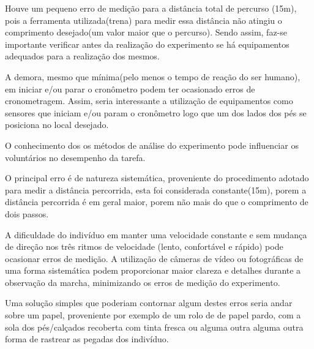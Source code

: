 \documentclass[a4paper,10pt]{article}
\begin{document}
Houve um pequeno erro de medição para a distância total de percurso (15m), pois a ferramenta utilizada(trena) para medir essa distância não atingiu o comprimento desejado(um valor maior que o percurso). Sendo assim, faz-se importante verificar antes da realização do experimento se há equipamentos adequados para a realização dos mesmos.

A demora, mesmo que mínima(pelo menos o tempo de reação do ser humano), em iniciar e/ou parar o cronômetro podem ter ocasionado erros de cronometragem. Assim, seria interessante a utilização de equipamentos como sensores que iniciam e/ou param o cronômetro logo que um dos lados dos pés se posiciona no local desejado.

O conhecimento dos os métodos de análise do experimento pode influenciar os voluntários no desempenho da tarefa. 

O principal erro é de natureza sistemática, proveniente do procedimento adotado para medir a distância percorrida, esta foi considerada constante(15m), porem a distância percorrida é em geral maior, porem não mais do que o comprimento de dois passos.

A dificuldade do indivíduo em manter uma velocidade constante e sem mudança de direção nos três ritmos de velocidade (lento, confortável e rápido) pode ocasionar erros de medição. A utilização de câmeras de vídeo ou fotográficas de uma forma sistemática podem proporcionar maior clareza e detalhes durante a observação da marcha, minimizando os erros de medição do experimento.

Uma solução simples que poderiam contornar algum destes erros seria andar sobre um papel, proveniente por exemplo de um rolo de de papel pardo, com a sola dos pés/calçados recoberta com tinta fresca ou alguma outra alguma outra forma de rastrear as pegadas dos indivíduo.
\end{document}
